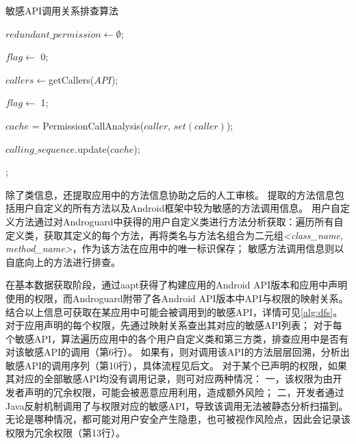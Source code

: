 \begin{algorithm}[!ht]
    \tablewuhao
    \caption{敏感API调用关系排查算法}
    \label{alg:dfs}

     {

        $redundant\_permission \gets \emptyset$;

         {

            $flag \gets$ 0;

             {

                $callers \gets $getCallers($API$);

                 {

                    $flag \gets$ 1;

                }

                 {

                    $cache$ = PermissionCallAnalysis($caller$, $set(caller)$);

                    $calling\_sequence$.update($cache$);

                }
            }


        }
        ;

    }
\end{algorithm}

除了类信息，\componentC 还提取应用中的方法信息协助之后的人工审核。
提取的方法信息包括用户自定义的所有方法以及Android框架中较为敏感的方法调用信息。
用户自定义方法通过对Androguard中获得的用户自定义类进行方法分析获取：\componentC 遍历所有自定义类，获取其定义的每个方法，再将类名与方法名组合为二元组\textit{<class\_name, method\_name>}，作为该方法在应用中的唯一标识保存；
敏感方法调用信息则以自底向上的方法进行排查。

在基本数据获取阶段，\componentC 通过aapt获得了构建应用的Android API版本和应用中声明使用的权限，而Androguard附带了各Android API版本中API与权限的映射关系。
结合以上信息可获取在某应用中可能会被调用到的敏感API，详情可见\autoref{alg:dfs}。
对于应用声明的每个权限，先通过映射关系查出其对应的敏感API列表；
对于每个敏感API，算法遍历应用中的各个用户自定义类和第三方类，排查应用中是否有对该敏感API的调用（第6行）。
如果有，则对调用该API的方法层层回溯，分析出敏感API的调用序列（第10行），具体流程见后文。
对于某个已声明的权限，如果其对应的全部敏感API均没有调用记录，则可对应两种情况：
一，该权限为由开发者声明的冗余权限，可能会被恶意应用利用，造成额外风险；
二，开发者通过Java反射机制调用了与权限对应的敏感API，导致该调用无法被静态分析扫描到。
无论是哪种情况，都可能对用户安全产生隐患，也可被视作风险点，因此\componentC 会记录该权限为冗余权限（第13行）。

